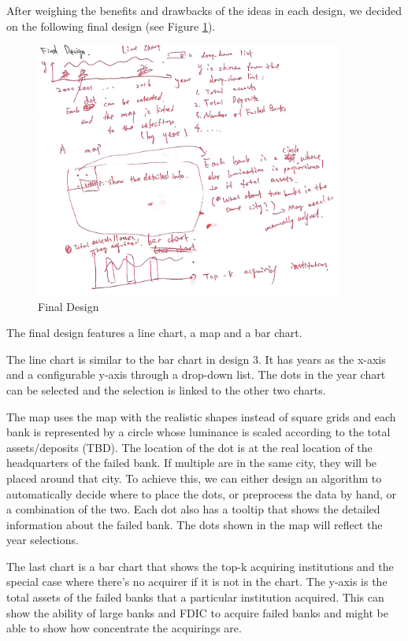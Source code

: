 \documentclass[11pt]{article}
\begin{document}
After weighing the benefits and drawbacks of the ideas in each design, we
decided on the following final design (see Figure \ref{fig:final_design}).

\begin{figure}[!h]
    \centering
    \includegraphics[width=0.9\textwidth]{fig/final_design}
    \caption{Final Design}
    \label{fig:final_design}
\end{figure}

The final design features a line chart, a map and a bar chart.

The line chart is similar to the bar chart in design 3. It has years as the
x-axis and a configurable y-axis through a drop-down list. The dots in the
year chart can be selected and the selection is linked to the other two
charts.

The map uses the map with the realistic shapes instead of square grids and
each bank is represented by a circle whose luminance is scaled according to
the total assets/deposits (TBD). The location of the dot is at the real
location of the headquarters of the failed bank. If multiple are in the same
city, they will be placed around that city. To achieve this, we can either
design an algorithm to automatically decide where to place the dots, or
preprocess the data by hand, or a combination of the two. Each dot also has a
tooltip that shows the detailed information about the failed bank. The dots
shown in the map will reflect the year selections.

The last chart is a bar chart that shows the top-k acquiring institutions and
the special case where there's no acquirer if it is not in the chart. The
y-axis is the total assets of the failed banks that a particular institution
acquired. This can show the ability of large banks and FDIC to acquire failed
banks and might be able to show how concentrate the acquirings are.
\end{document}
